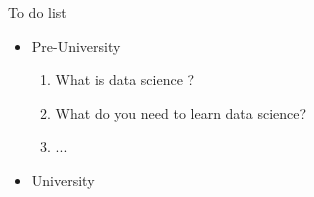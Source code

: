 \documentclass{article}
\begin{document}
    \begin{center}
        \Large
        To do list
    \end{center}
    \normalsize
    \begin{itemize}
        \item Pre-University
        \begin{enumerate}
            \item What is data science ?
            \item What do you need to learn data science?
            \item ...
        \end{enumerate}
        \item University
        \begin{enumerate}
            
        \end{enumerate}
    \end{itemize}
\end{document}
